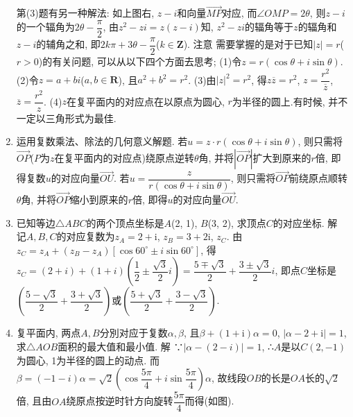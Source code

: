\documentclass[10pt,a4paper]{article}
\begin{document}
\begin{enumerate}[1.]
\begin{center}
\end{center}
第(3)题有另一种解法: 如上图右, $z-i$和向量$\overrightarrow{MP}$对应, 而$\angle OMP=2\theta$, 则$z-i$的一个辐角为$2\theta -\dfrac{\pi }2$, 由$z^2-zi=z(z-i)$知, $z^2-zi$的辐角等于$z$的辐角和$z-i$的辅角之和, 即$2k\pi +3\theta -\dfrac{\pi }2$($k\in \mathbf{Z}$).
注意  需要掌握的是对于已知$|z|=r$($r>0$)的有关问题, 可以从以下四个方面去思考;
(1)令$z=r(\cos \theta +i\sin \theta)$.
(2)令$z=a+bi$($a,b\in \mathbf{R}$), 且$a^2+b^2=r^2$.
(3)由$|z|^2=r^2$, 得$z\overline z=r^2$, $z=\dfrac{r^2}{\overline z}$, $\overline z=\dfrac{r^2}z$.
(4)$z$在复平面内的对应点在以原点为圆心, $r$为半径的圆上.有时候, 并不一定以三角形式为最佳.
\item 运用复数乘法、除法的几何意义解题.
若$u=z\cdot r(\cos \theta +i\sin \theta)$, 则只需将$\overrightarrow{OP}$($P$为$z$在复平面内的对应点)绕原点逆转$\theta$角, 并将$|\overrightarrow{OP}|$扩大到原来的$r$倍, 即得复数$u$的对应向量$\overrightarrow{OU}$.
若$u=\dfrac z{r(\cos \theta +i\sin \theta)}$, 则只需将$\overrightarrow{OP}$前绕原点顺转$\theta$角, 并将$\overrightarrow{OP}$缩小到原来的$r$倍, 即得$u$的对应向量$\overrightarrow{OU}$.
\item 已知等边$\triangle ABC$的两个顶点坐标是$A$(2, 1), $B$(3, 2), 求顶点$C$的对应坐标.
解  记$A,B,C$的对应复数为$z_A=2+\mathrm{i}$, $z_B=3+2\mathrm{i}$, $z_C$.
由$z_C=z_A+(z_B-z_A)[\cos 60^{\circ }\pm i\sin 60^{\circ }]$,
得$z_C=(2+i)+(1+i)(\dfrac 12\pm \dfrac{\sqrt 3}2i)=\dfrac{5\mp \sqrt 3}2+\dfrac{3\pm \sqrt 3}2i$,
即点$C$坐标是$(\dfrac{5-\sqrt 3}2+\dfrac{3+\sqrt 3}2)$或$(\dfrac{5+\sqrt 3}2+\dfrac{3-\sqrt 3}2)$.
\item 复平面内, 两点$A,B$分別对应于复数$\alpha ,\beta$, 且$\beta +(1+\mathrm{i})\alpha =0$, $|\alpha -2+\mathrm{i}|=1$, 求$\triangle AOB$面积的最大值和最小值.
解  ∵$|\alpha -(2-i)|=1$,
∴$A$是以$C(2,-1)$为圆心, 1为半径的圆上的动点.
而$\beta =(-1-i)\alpha =\sqrt 2(\cos \dfrac{5\pi }4+i\sin \dfrac{5\pi }4)\alpha$,
故线段$OB$的长是$OA$长的$\sqrt 2$倍, 且由$OA$绕原点按逆时针方向旋转$\dfrac{5\pi }4$而得(如图).
\begin{center}
\end{center}
\end{enumerate}
\end{document}
